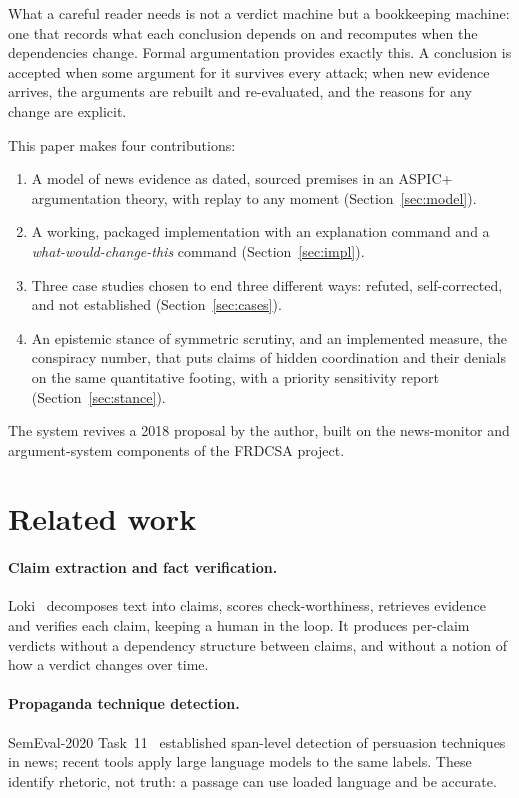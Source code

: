 \documentclass[11pt]{article}
\begin{document}
What a careful reader needs is not a verdict machine but a
bookkeeping machine: one that records what each conclusion depends on and
recomputes when the dependencies change. Formal argumentation provides
exactly this. A conclusion is accepted when some argument for it
survives every attack; when new evidence arrives, the arguments are
rebuilt and re-evaluated, and the reasons for any change are explicit.

This paper makes four contributions:
\begin{enumerate}[nosep]
\item A model of news evidence as dated, sourced premises in an ASPIC+
argumentation theory, with replay to any moment
(Section~\ref{sec:model}).
\item A working, packaged implementation with an explanation command
and a \emph{what-would-change-this} command (Section~\ref{sec:impl}).
\item Three case studies chosen to end three different ways: refuted, self-corrected,
and not established (Section~\ref{sec:cases}).
\item An epistemic stance of symmetric scrutiny, and an implemented
measure, the conspiracy number, that puts claims of hidden coordination
and their denials on the same quantitative footing, with a priority
sensitivity report (Section~\ref{sec:stance}).
\end{enumerate}

The system revives a 2018 proposal by the author, built on the news-monitor
and argument-system components of the FRDCSA project.

\section{Related work}
\label{sec:related}

\paragraph{Claim extraction and fact verification.}
Loki~\cite{loki} decomposes text into claims, scores check-worthiness,
retrieves evidence and verifies each claim, keeping a human in the loop.
It produces per-claim verdicts without a dependency structure between
claims, and without a notion of how a verdict changes over time.

\paragraph{Propaganda technique detection.}
SemEval-2020 Task~11~\cite{semeval2020} established span-level detection
of persuasion techniques in news; recent tools apply large language
models to the same labels. These identify rhetoric, not truth: a
passage can use loaded language and be accurate.
\end{document}
